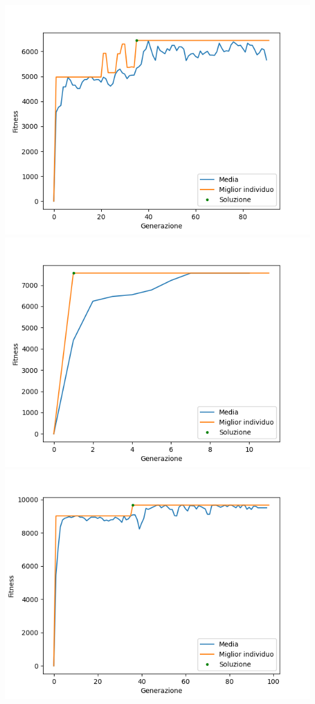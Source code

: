 \documentclass{CSUniSchoolLabReport}
\begin{document}
\begin{center}
	\includegraphics[scale=0.25]{results/3}
	\includegraphics[scale=0.25]{results/4}
	\includegraphics[scale=0.25]{results/5}

\end{center}
\end{document}
